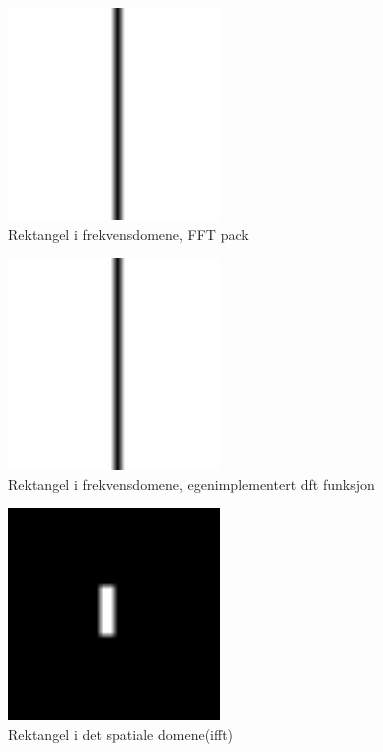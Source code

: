 \documentclass[a4paper, 12pt]{article}
\begin{document}
\begin{figure}[h]
  \centering
  \includegraphics[width=0.5\textwidth]{images/fftpack-rektangel}
  \caption{Rektangel i frekvensdomene, FFT pack}
  \label{fig:fft}
\end{figure}


\begin{figure}[h]
  \centering
  \includegraphics[width=0.5\textwidth]{images/myfft-rektangel}
  \caption{Rektangel i frekvensdomene, egenimplementert dft funksjon}
  \label{fig:dft}
\end{figure}


\begin{figure}[h]
  \centering
  \includegraphics[width=0.5\textwidth]{images/ifft-rektangel}
  \caption{Rektangel i det spatiale domene(ifft)}
  \label{fig:ifft}
\end{figure}
\end{document}
